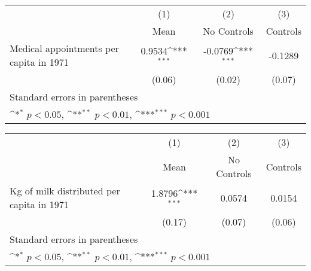 {
\def\sym#1{\ifmmode^{#1}\else\(^{#1}\)\fi}
\begin{tabular}{l*{3}{c}}
\hline\hline
                    &\multicolumn{1}{c}{(1)}&\multicolumn{1}{c}{(2)}&\multicolumn{1}{c}{(3)}\\
                    &\multicolumn{1}{c}{Mean}&\multicolumn{1}{c}{No Controls}&\multicolumn{1}{c}{Controls}\\
\hline
Medical appointments per capita in 1971&      0.9534\sym{***}&     -0.0769\sym{***}&     -0.1289         \\
                    &      (0.06)         &      (0.02)         &      (0.07)         \\
\hline\hline
\multicolumn{4}{l}{\footnotesize Standard errors in parentheses}\\
\multicolumn{4}{l}{\footnotesize \sym{*} \(p<0.05\), \sym{**} \(p<0.01\), \sym{***} \(p<0.001\)}\\
\end{tabular}
}
{
\def\sym#1{\ifmmode^{#1}\else\(^{#1}\)\fi}
\begin{tabular}{l*{3}{c}}
\hline\hline
                    &\multicolumn{1}{c}{(1)}&\multicolumn{1}{c}{(2)}&\multicolumn{1}{c}{(3)}\\
                    &\multicolumn{1}{c}{Mean}&\multicolumn{1}{c}{No Controls}&\multicolumn{1}{c}{Controls}\\
\hline
Kg of milk distributed per capita in 1971&      1.8796\sym{***}&      0.0574         &      0.0154         \\
                    &      (0.17)         &      (0.07)         &      (0.06)         \\
\hline\hline
\multicolumn{4}{l}{\footnotesize Standard errors in parentheses}\\
\multicolumn{4}{l}{\footnotesize \sym{*} \(p<0.05\), \sym{**} \(p<0.01\), \sym{***} \(p<0.001\)}\\
\end{tabular}
}
